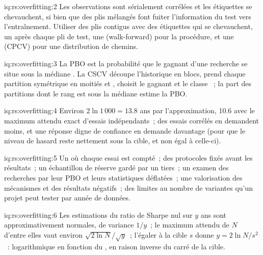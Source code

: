 \begin{solution}{iq:rs:overfitting:2}
Les observations sont sérialement corrélées et les étiquettes se chevauchent, si bien que des plis mélangés font fuiter l'information du test vers l'entraînement. Utiliser des plis contigus avec  des
étiquettes qui se chevauchent, un  après chaque pli de test, une  (walk-forward) pour la procédure, et une  (CPCV) pour une distribution de chemins.
\end{solution}

\begin{solution}{iq:rs:overfitting:3}
La PBO est la probabilité que le gagnant d'une recherche  se situe sous la médiane . La CSCV découpe l'historique en blocs, prend chaque
partition symétrique en moitiés  et , choisit le gagnant  et le classe ~; la part des partitions dont le rang est sous la médiane
estime la PBO.
\end{solution}

\begin{solution}{iq:rs:overfitting:4}
Environ $2\ln 1\,000 = 13.8$ ans par l'approximation, 10.6 avec le maximum attendu exact d'essais indépendants~; des essais corrélés en demandent moins, et une réponse
digne de confiance en demande davantage (pour que le niveau de hasard reste nettement sous la cible, et non égal à celle-ci).
\end{solution}

\begin{solution}{iq:rs:overfitting:5}
Un  où chaque essai est compté~; des protocoles fixés avant les résultats~; un échantillon de réserve gardé par un tiers~; un examen des recherches par leur PBO et leurs statistiques déflatées~;
une valorisation des mécanismes et des résultats négatifs~; des limites au nombre de variantes qu'un projet peut tester par année de données.
\end{solution}

\begin{solution}{iq:rs:overfitting:6}
Les estimations du ratio de Sharpe nul sur $y$ ans sont approximativement normales, de variance $1/y$~; le maximum attendu de $N$ d'entre elles vaut environ $\sqrt{2\ln N}/\sqrt y$~; l'égaler à la
cible $s$ donne $y = 2\ln N/s^2$~: logarithmique en fonction du , en raison inverse du carré de la cible.
\end{solution}
